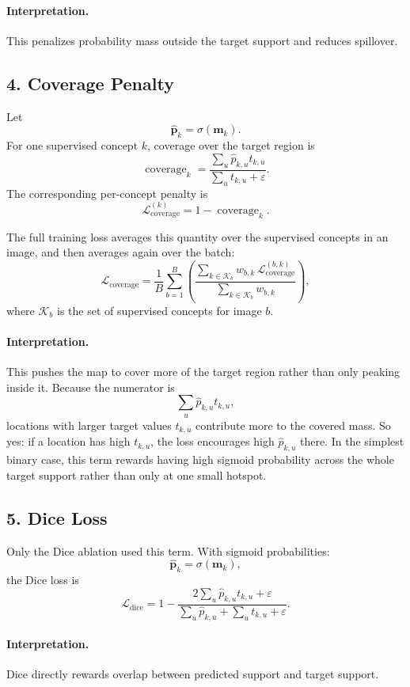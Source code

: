 \documentclass[11pt]{article}
\begin{document}
\paragraph{Interpretation.}
This penalizes probability mass outside the target support and reduces spillover.

\subsection{4. Coverage Penalty}
Let
\[
\hat{\mathbf{p}}_k = \sigma(\mathbf{m}_k).
\]
For one supervised concept $k$, coverage over the target region is
\[
\operatorname{coverage}_k
=
\frac{
\sum_u \hat{p}_{k,u} t_{k,u}
}{
\sum_u t_{k,u} + \varepsilon
}.
\]
The corresponding per-concept penalty is
\[
\mathcal{L}_{\mathrm{coverage}}^{(k)}
=
1 - \operatorname{coverage}_k.
\]

The full training loss averages this quantity over the supervised concepts in an
image, and then averages again over the batch:
\[
\mathcal{L}_{\mathrm{coverage}}
=
\frac{1}{B}\sum_{b=1}^{B}
\left(
\frac{
\sum_{k \in \mathcal{K}_b}
w_{b,k}\,
\mathcal{L}_{\mathrm{coverage}}^{(b,k)}
}{
\sum_{k \in \mathcal{K}_b} w_{b,k}
}
\right),
\]
where $\mathcal{K}_b$ is the set of supervised concepts for image $b$.

\paragraph{Interpretation.}
This pushes the map to cover more of the target region rather than only peaking
inside it. Because the numerator is
\[
\sum_u \hat{p}_{k,u} t_{k,u},
\]
locations with larger target values $t_{k,u}$ contribute more to the covered
mass. So yes: if a location has high $t_{k,u}$, the loss encourages high
$\hat{p}_{k,u}$ there. In the simplest binary case, this term rewards having
high sigmoid probability across the whole target support rather than only at one
small hotspot.

\subsection{5. Dice Loss}
Only the Dice ablation used this term. With sigmoid probabilities:
\[
\hat{\mathbf{p}}_k = \sigma(\mathbf{m}_k),
\]
the Dice loss is
\[
\mathcal{L}_{\mathrm{dice}}
=
1 -
\frac{
2 \sum_u \hat{p}_{k,u} t_{k,u} + \varepsilon
}{
\sum_u \hat{p}_{k,u} + \sum_u t_{k,u} + \varepsilon
}.
\]

\paragraph{Interpretation.}
Dice directly rewards overlap between predicted support and target support.
\end{document}
